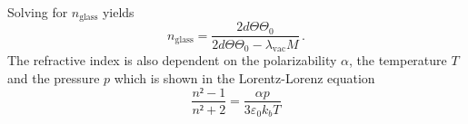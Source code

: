  Solving for $n_{\text{glass}}$ yields 
 \begin{equation}
    n_{\text{glass}} = \frac{2d \Theta \Theta_0}{2d \Theta \Theta_0 - \lambda_{\text{vac}}M} \label{eqn:n_glass_umgestellt}\, .
 \end{equation}
 The refractive index is also dependent on the polarizability $\alpha$, the temperature $T$ and the pressure $p$ which is shown in the 
 Lorentz-Lorenz equation 
 \begin{equation}
   \frac{n²-1}{n²+2} = \frac{\alpha p}{3 \varepsilon_0 k_b T} 
   \label{eqn:Lorentz_Lorenz}
 \end{equation}